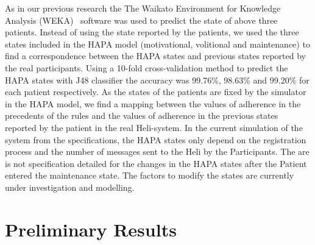 \documentclass{llncs}
\begin{document}
As in our previous research the The Waikato Environment for Knowledge Analysis (WEKA)~\cite{WEKA} software was used to predict the state of above three patients. Instead of using the state reported by the patients, we used the three states included in the HAPA model (motivational, volitional and maintenance) to find a correspondence between the HAPA states and previous states reported by the real participants.  Using a 10-fold cross-validation method to predict the HAPA states with J48 classifier the accuracy was  99.76\%, 98.63\% and 99.20\% for each patient respectively. As the states of the patients are fixed by the simulator in the HAPA model, we find a mapping between the values of adherence in the precedents of the rules and the values of adherence in the previous states reported by the patient in the real Heli-system. In the current simulation of the system from the specifications, the HAPA states only depend on the registration process and the number of messages sent to the Heli by the Participants. The are is not specification detailed for the changes in the HAPA states after the Patient entered the maintenance state. The factors to modify the states are currently under investigation and modelling.

\section {Preliminary Results}
\label{sec.results}
\end{document}
